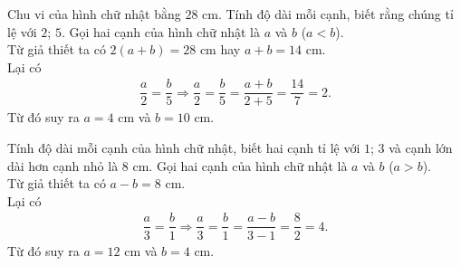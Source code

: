 
\begin{bt}%
 Chu vi của hình chữ nhật bằng $28$ cm. Tính độ dài mỗi cạnh, biết rằng chúng tỉ lệ với $2$; $5$.
 \loigiai
  {
  Gọi hai cạnh của hình chữ nhật là $a$ và $b$ ($a<b$).\\
  Từ giả thiết ta có $2(a+b)=28$ cm hay $a+b=14$ cm.\\
  Lại có
  \begin{eqnarray*}
  	\dfrac{a}{2} = \dfrac{b}{5} \Rightarrow \dfrac{a}{2}=\dfrac{b}{5}=\dfrac{a+b}{2+5}= \dfrac{14}{7} = 2.
  \end{eqnarray*}
  Từ đó suy ra $a=4$ cm và $b=10$ cm.
  }
\end{bt}

\begin{bt}%
 Tính độ dài mỗi cạnh của hình chữ nhật, biết hai cạnh tỉ lệ với $1$; $3$ và cạnh lớn dài hơn cạnh nhỏ là $8$ cm.
 \loigiai
  {
  Gọi hai cạnh của hình chữ nhật là $a$ và $b$ ($a>b$).\\
  Từ giả thiết ta có $a-b=8$ cm.\\
  Lại có
  \begin{eqnarray*}
  	\dfrac{a}{3} = \dfrac{b}{1} \Rightarrow \dfrac{a}{3}=\dfrac{b}{1}=\dfrac{a-b}{3-1}= \dfrac{8}{2} = 4.
  \end{eqnarray*}
  Từ đó suy ra $a=12$ cm và $b=4$ cm.
  }
\end{bt}

